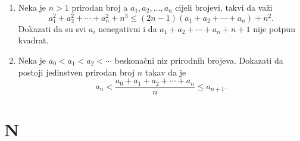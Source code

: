 \documentclass{article}
\begin{document}
\begin{enumerate}
    \item Neka je $n > 1$ prirodan broj a $a_1, a_2, \ldots, a_n$ cijeli brojevi, takvi da va\v{z}i
    \[
    a_1^2 + a_2^2 + \cdots + a_n^2 + n^3 \le (2n-1)(a_1 + a_2 + \cdots + a_n) + n^2.
    \]
    Dokazati da su svi $a_i$ nenegativni i da $a_1 + a_2 + \cdots + a_n + n + 1$ nije potpun kvadrat.

    \item Neka je $a_0 < a_1 < a_2 < \cdots$ beskona\v{c}ni niz prirodnih brojeva. Dokazati da postoji jedinstven prirodan broj $n$ takav da je
    \[
    a_n < \frac{a_0 + a_1 + a_2 + \cdots + a_n}{n} \le a_{n+1}.
    \]
\end{enumerate}

\section{N}
\end{document}
